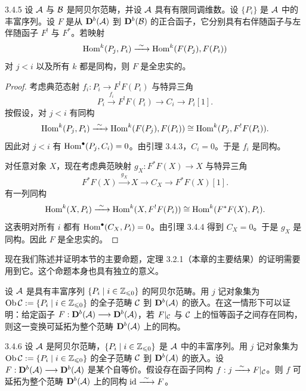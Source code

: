 \begin{lemma}{3.4.5}
设 $\mathcal{A}$ 与 $\mathcal{B}$ 是阿贝尔范畴，并设 $\mathcal{A}$ 具有有限同调维数。设 $\{P_i\}$ 是 $\mathcal{A}$ 中的丰富序列。设 $F$ 是从 $\mathbf{D}^{b}(\mathcal{A})$ 到 $\mathbf{D}^{b}(\mathcal{B})$ 的正合函子，它分别具有右伴随函子与左伴随函子 $F^{!}$ 与 $F^{*}$。若映射
\begin{equation*}
\operatorname{Hom}^{k}(P_j,P_i)\xrightarrow{\ \sim\ }\operatorname{Hom}^{k}(F(P_j),F(P_i))
\end{equation*}
对 $j<i$ 以及所有 $k$ 都是同构，则 $F$ 是全忠实的。
\end{lemma}

\begin{proof}
考虑典范态射 $f_i:P_i\longrightarrow F^{!}F(P_i)$ 与特异三角
\begin{equation*}
P_i\xrightarrow{\ f_i\ }F^{!}F(P_i)\longrightarrow C_i\longrightarrow P_i[1].
\end{equation*}
按假设，对 $j<i$ 有同构
\begin{equation*}
\operatorname{Hom}^{k}(P_j,P_i)\xrightarrow{\ \sim\ }\operatorname{Hom}^{k}(F(P_j),F(P_i))\cong\operatorname{Hom}^{k}(P_j,F^{!}F(P_i)).
\end{equation*}
因此对 $j<i$ 有 $\operatorname{Hom}^{\bullet}(P_j,C_i)=0$。由引理 3.4.3，$C_i=0$。于是 $f_i$ 是同构。

对任意对象 $X$，现在考虑典范映射 $g_X:F^{*}F(X)\longrightarrow X$ 与特异三角
\begin{equation*}
F^{*}F(X)\xrightarrow{\ g_X\ }X\longrightarrow C_X\longrightarrow F^{*}F(X)[1].
\end{equation*}
有一列同构
\begin{equation*}
\operatorname{Hom}^{k}(X,P_i)\xrightarrow{\ \sim\ }\operatorname{Hom}^{k}(X,F^{!}F(P_i))\cong\operatorname{Hom}^{k}(F^{*}F(X),P_i).
\end{equation*}
这表明对所有 $i$ 都有 $\operatorname{Hom}^{\bullet}(C_X,P_i)=0$。由引理 3.4.4 得到 $C_X=0$。于是 $g_X$ 是同构。因此 $F$ 是全忠实的。
\end{proof}

现在我们陈述并证明本节的主要命题，定理 3.2.1（本章的主要结果）的证明需要用到它。这个命题本身也具有独立的意义。

设 $\mathcal{A}$ 是具有丰富序列 $\{P_i\mid i\in\mathbb{Z}_{\leqslant 0}\}$ 的阿贝尔范畴。用 $j$ 记对象集为 $\operatorname{Ob}\mathcal{C}:=\{P_i\mid i\in\mathbb{Z}_{\leqslant 0}\}$ 的全子范畴 $\mathcal{C}$ 到 $\mathbf{D}^{b}(\mathcal{A})$ 的嵌入。在这一情形下可以证明：给定函子 $F:\mathbf{D}^{b}(\mathcal{A})\longrightarrow\mathbf{D}^{b}(\mathcal{A})$，若 $F|_{\mathcal{C}}$ 与 $\mathcal{C}$ 上的恒等函子之间存在同构，则这一变换可延拓为整个范畴 $\mathbf{D}^{b}(\mathcal{A})$ 上的同构。

\begin{proposition}{3.4.6}
设 $\mathcal{A}$ 是阿贝尔范畴，$\{P_i\mid i\in\mathbb{Z}_{\leqslant 0}\}$ 是 $\mathcal{A}$ 中的丰富序列。用 $j$ 记对象集为 $\operatorname{Ob}\mathcal{C}:=\{P_i\mid i\in\mathbb{Z}_{\leqslant 0}\}$ 的全子范畴 $\mathcal{C}$ 到 $\mathbf{D}^{b}(\mathcal{A})$ 的嵌入。设 $F:\mathbf{D}^{b}(\mathcal{A})\longrightarrow\mathbf{D}^{b}(\mathcal{A})$ 是某个自等价。假设存在函子同构 $f:j\xrightarrow{\ \sim\ } F|_{\mathcal{C}}$。则 $f$ 可延拓为整个范畴 $\mathbf{D}^{b}(\mathcal{A})$ 上的同构 $\mathrm{id}\xrightarrow{\ \sim\ } F$。
\end{proposition}

